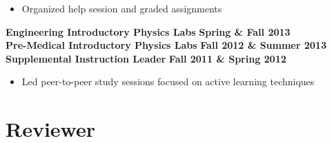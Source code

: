 \documentclass[margin]{res}
\begin{document}
\begin{resume}
    \begin{itemize}\itemsep -2pt
    \item[] Organized help session and graded assignments
    \end{itemize} \vspace{-12pt}
\textbf{Engineering Introductory Physics Labs} \hfill{} \textbf{Spring \& Fall 2013}\\
\textbf{Pre-Medical Introductory Physics Labs} \hfill{} \textbf{Fall 2012 \& Summer 2013}\\
{\bf Supplemental Instruction Leader} \hfill{} \textbf{Fall 2011 \& Spring 2012}
    \begin{itemize}\itemsep -2pt
    \item[] Led peer-to-peer study sessions focused on active learning techniques
    \end{itemize}


\begin{comment}
year |   Fall        | Spring        | Summer
1st  | Labs-premed   | labs-eng      | labs-premed
2nd  | Labs-eng      | RA            | RA
3rd  | RA/IntroAstro | Peter's intro | RA
4th  | IntroAstro    | Python        | RA
5th  | Physics C HW  | RA            | RA & REU classes
6th  | Fellowship (GRE Class) | Python | NA!?!
\end{comment}






\section{Reviewer}


\end{resume}
\end{document}
